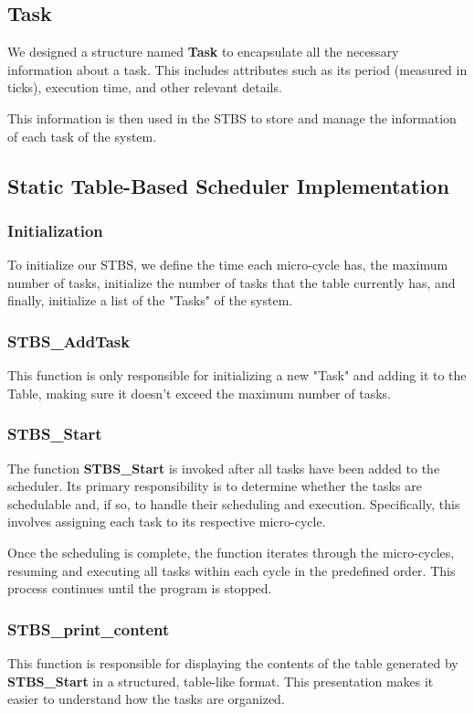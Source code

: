 \documentclass[a4paper,12pt]{article}
\begin{document}
\subsection{Task}
We designed a structure named \textbf{Task} to encapsulate all the necessary information about a task. This includes attributes such as its period (measured in ticks), execution time, and other relevant details.

This information is then used in the STBS to store and manage the information of each task of the system.

\subsection{Static Table-Based Scheduler Implementation}
\subsubsection{Initialization}
To initialize our STBS, we define the time each micro-cycle has, the maximum number of tasks, initialize the number of tasks that the table currently has, and finally, initialize a list of the "Tasks" of the system.

\subsubsection{STBS\_AddTask}
This function is only responsible for initializing a new "Task" and adding it to the Table, making sure it doesn't exceed the maximum number of tasks.

\subsubsection{STBS\_Start}
The function \textbf{STBS\_Start} is invoked after all tasks have been added to the scheduler. Its primary responsibility is to determine whether the tasks are schedulable and, if so, to handle their scheduling and execution. Specifically, this involves assigning each task to its respective micro-cycle. 

Once the scheduling is complete, the function iterates through the micro-cycles, resuming and executing all tasks within each cycle in the predefined order. This process continues until the program is stopped.

\subsubsection{STBS\_print\_content}
This function is responsible for displaying the contents of the table generated by \textbf{STBS\_Start} in a structured, table-like format. This presentation makes it easier to understand how the tasks are organized.
\end{document}
